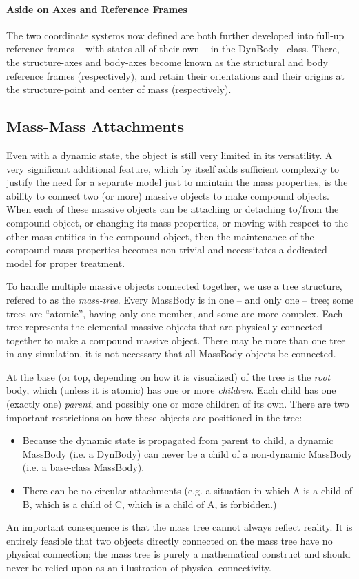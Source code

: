 \paragraph {Aside on Axes and Reference Frames}
The two coordinate systems now defined are both further developed into 
full-up reference frames -- with states all of their own -- in the 
DynBody~\cite{dynenv:DYNBODY} class.
There, the structure-axes and body-axes become known as the structural and 
body reference frames (respectively), and retain their orientations and their 
origins at the structure-point and center of mass (respectively).

\subsection{Mass-Mass Attachments}
Even with a dynamic state, the object is still very limited in its 
versatility. 
A very significant additional feature, which by itself adds sufficient 
complexity to justify the need for a separate model just to maintain the mass 
properties, is the ability to connect 
two (or more) massive objects to make compound objects.  When each of these 
massive objects can be attaching or detaching to/from the compound object, or 
changing its mass properties, or 
moving with respect to the other mass entities in the compound object, then 
the 
maintenance of the compound mass properties becomes non-trivial and 
necessitates a dedicated model for proper treatment.

To handle multiple massive objects connected together, we use a tree 
structure, refered to as the \textit{mass-tree}.
Every MassBody is in one -- and only one -- tree; some trees are ``atomic'', 
having only one member, 
and some are more complex.  Each tree represents the elemental massive objects 
that are physically connected together to make a compound massive object.  
There may be more than one tree in any simulation, it is not necessary that 
all MassBody objects be connected.
 
At the base (or top, depending on how it is visualized) of the tree is the 
\textit{root} body, 
which (unless it is atomic) has one or more \textit{children}.  Each child has 
one (exactly one) \textit{parent}, and possibly one or more children of its 
own.  There are two important restrictions on how these objects are positioned 
in the tree:
\begin{itemize}
 \item Because the dynamic state is propagated from parent to child, a dynamic 
 MassBody (i.e. a DynBody) can never be a child of a non-dynamic MassBody 
 (i.e. 
 a base-class MassBody).
 \item There can be no circular attachments (e.g. a situation in which A is a 
 child of B, which is a child of C, which is a child of A, is forbidden.)
\end{itemize}
An important consequence is that the mass tree cannot always 
reflect reality.  It is entirely feasible that two objects directly connected 
on the mass tree have no physical connection; the mass tree is purely a 
mathematical construct and should never be relied upon as an illustration of 
physical connectivity.

